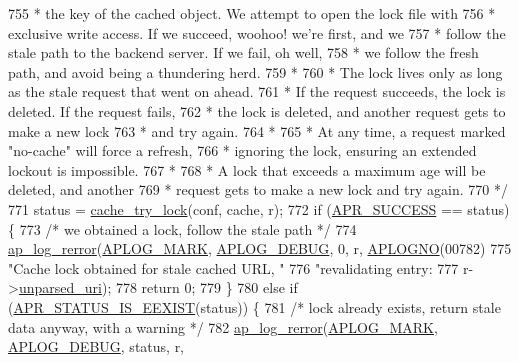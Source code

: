 \begin{DoxyCode}
{{755 \textcolor{comment}{     * the key of the cached object. We attempt to open the lock file with}
756 \textcolor{comment}{     * exclusive write access. If we succeed, woohoo! we're first, and we}
757 \textcolor{comment}{     * follow the stale path to the backend server. If we fail, oh well,}
758 \textcolor{comment}{     * we follow the fresh path, and avoid being a thundering herd.}
759 \textcolor{comment}{     *}
760 \textcolor{comment}{     * The lock lives only as long as the stale request that went on ahead.}
761 \textcolor{comment}{     * If the request succeeds, the lock is deleted. If the request fails,}
762 \textcolor{comment}{     * the lock is deleted, and another request gets to make a new lock}
763 \textcolor{comment}{     * and try again.}
764 \textcolor{comment}{     *}
765 \textcolor{comment}{     * At any time, a request marked "no-cache" will force a refresh,}
766 \textcolor{comment}{     * ignoring the lock, ensuring an extended lockout is impossible.}
767 \textcolor{comment}{     *}
768 \textcolor{comment}{     * A lock that exceeds a maximum age will be deleted, and another}
769 \textcolor{comment}{     * request gets to make a new lock and try again.}
770 \textcolor{comment}{     */}
771     status = \hyperlink{group__Cache__util_gaffa94dfea5098ffab89d1dc91e094415}{cache\_try\_lock}(conf, cache, r);
772     \textcolor{keywordflow}{if} (\hyperlink{group__apr__errno_ga9ee311b7bf1c691dc521d721339ee2a6}{APR\_SUCCESS} == status) \{
773         \textcolor{comment}{/* we obtained a lock, follow the stale path */}
774         \hyperlink{group__APACHE__CORE__LOG_ga4c112558ccffd6b363da102b2052d2a6}{ap\_log\_rerror}(\hyperlink{group__APACHE__CORE__LOG_ga655e126996849bcb82e4e5a14c616f4a}{APLOG\_MARK}, \hyperlink{group__APACHE__CORE__LOG_gadfcef90537539cf2b7d35cfbbbafeb93}{APLOG\_DEBUG}, 0, r, 
      \hyperlink{group__APACHE__CORE__LOG_ga1dee8a07e06bc5b3de8b89662c2cd666}{APLOGNO}(00782)
775                 \textcolor{stringliteral}{"Cache lock obtained for stale cached URL, "}
776                 \textcolor{stringliteral}{"revalidating entry: %
777                 r->\hyperlink{structrequest__rec_a2c0077c30ea4446551ecee4e24ced868}{unparsed\_uri});
778         \textcolor{keywordflow}{return} 0;
779     \}
780     \textcolor{keywordflow}{else} \textcolor{keywordflow}{if} (\hyperlink{group__APR__STATUS__IS_ga37707a0f41b084f1ce1a13575f4f21db}{APR\_STATUS\_IS\_EEXIST}(status)) \{
781         \textcolor{comment}{/* lock already exists, return stale data anyway, with a warning */}
782         \hyperlink{group__APACHE__CORE__LOG_ga4c112558ccffd6b363da102b2052d2a6}{ap\_log\_rerror}(\hyperlink{group__APACHE__CORE__LOG_ga655e126996849bcb82e4e5a14c616f4a}{APLOG\_MARK}, \hyperlink{group__APACHE__CORE__LOG_gadfcef90537539cf2b7d35cfbbbafeb93}{APLOG\_DEBUG}, status, r, 
}}}
\end{DoxyCode}
